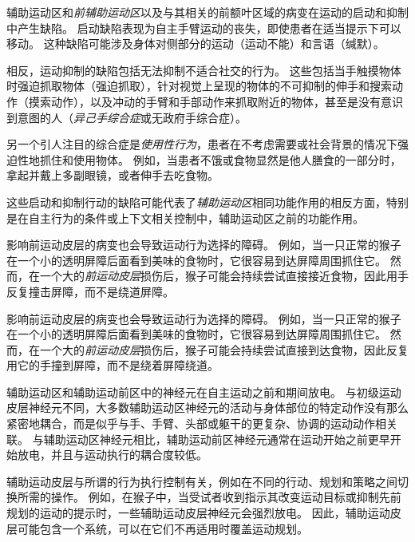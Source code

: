 \begin{proposition} \label{box:34_2}
	
	\quad \quad 辅助运动区和\textit{前辅助运动区}以及与其相关的前额叶区域的病变在运动的启动和抑制中产生缺陷。
	启动缺陷表现为自主手臂运动的丧失，即使患者在适当提示下可以移动。
	这种缺陷可能涉及身体对侧部分的运动（运动不能）和言语（缄默）。
	
	\quad \quad 相反，运动抑制的缺陷包括无法抑制不适合社交的行为。
	这些包括当手触摸物体时强迫抓取物体（强迫抓取），针对视觉上呈现的物体的不可抑制的伸手和搜索动作（摸索动作），以及冲动的手臂和手部动作来抓取附近的物体，甚至是没有意识到意图的人（\textit{异己手综合症}或无政府手综合症）。
	
	\quad \quad 另一个引人注目的综合症是\textit{使用性行为}，患者在不考虑需要或社会背景的情况下强迫性地抓住和使用物体。
	例如，当患者不饿或食物显然是他人膳食的一部分时，拿起并戴上多副眼镜，或者伸手去吃食物。
	
	\quad \quad 这些启动和抑制行动的缺陷可能代表了\textit{辅助运动区}相同功能作用的相反方面，特别是在自主行为的条件或上下文相关控制中，辅助运动区之前的功能作用。
	
	\quad \quad 影响前运动皮层的病变也会导致运动行为选择的障碍。
	例如，当一只正常的猴子在一个小的透明屏障后面看到美味的食物时，它很容易到达屏障周围抓住它。
	然而，在一个大的\textit{前运动皮层}损伤后，猴子可能会持续尝试直接接近食物，因此用手反复撞击屏障，而不是绕道屏障。
	
	\quad \quad 影响前运动皮层的病变也会导致运动行为选择的障碍。
	例如，当一只正常的猴子在一个小的透明屏障后面看到美味的食物时，它很容易到达屏障周围抓住它。
	然而，在一个大的\textit{前运动皮层}损伤后，猴子可能会持续尝试直接到达食物，因此反复用它的手撞到屏障，而不是绕着屏障绕道。
	
\end{proposition}


辅助运动区和辅助运动前区中的神经元在自主运动之前和期间放电。
与初级运动皮层神经元不同，大多数辅助运动区神经元的活动与身体部位的特定动作没有那么紧密地耦合，而是似乎与手、手臂、头部或躯干的更复杂、协调的运动动作相关联。
与辅助运动区神经元相比，辅助运动前区神经元通常在运动开始之前更早开始放电，并且与运动执行的耦合度较低。


辅助运动皮层与所谓的行为执行控制有关，例如在不同的行动、规划和策略之间切换所需的操作。
例如，在猴子中，当受试者收到指示其改变运动目标或抑制先前规划的运动的提示时，一些辅助运动皮层神经元会强烈放电。
因此，辅助运动皮层可能包含一个系统，可以在它们不再适用时覆盖运动规划。


